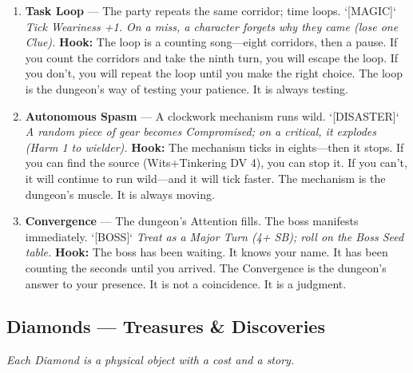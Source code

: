 \begin{enumerate}
\item[Q] \textbf{Task Loop} --- The party repeats the same corridor; time loops. `[MAGIC]`
  \hfill \textit{Tick Weariness +1. On a miss, a character forgets why they came (lose one Clue).}
  \textbf{Hook:} The loop is a counting song---eight corridors, then a pause. If you count the corridors and take the ninth turn, you will escape the loop. If you don't, you will repeat the loop until you make the right choice. The loop is the dungeon's way of testing your patience. It is always testing.

\item[K] \textbf{Autonomous Spasm} --- A clockwork mechanism runs wild. `[DISASTER]`
  \hfill \textit{A random piece of gear becomes Compromised; on a critical, it explodes (Harm 1 to wielder).}
  \textbf{Hook:} The mechanism ticks in eights---then it stops. If you can find the source (Wits+Tinkering DV 4), you can stop it. If you can't, it will continue to run wild---and it will tick faster. The mechanism is the dungeon's muscle. It is always moving.

\item[A] \textbf{Convergence} --- The dungeon's Attention fills. The boss manifests immediately. `[BOSS]`
  \hfill \textit{Treat as a Major Turn (4+ SB); roll on the Boss Seed table.}
  \textbf{Hook:} The boss has been waiting. It knows your name. It has been counting the seconds until you arrived. The Convergence is the dungeon's answer to your presence. It is not a coincidence. It is a judgment.
\end{enumerate}

\subsection*{Diamonds --- Treasures \& Discoveries}
\noindent\textit{Each Diamond is a physical object with a cost and a story.}

